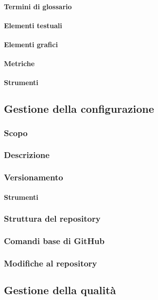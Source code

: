 \paragraph{Termini di glossario}
\paragraph{Elementi testuali}
\paragraph{Elementi grafici}
\paragraph{Metriche}
\paragraph{Strumenti}

\subsection{Gestione della configurazione}
\subsubsection{Scopo}
\subsubsection{Descrizione}
\subsubsection{Versionamento}
\paragraph{Strumenti}
\subsubsection{Struttura del repository}
\subsubsection{Comandi base di GitHub}
\subsubsection{Modifiche al repository}

\subsection{Gestione della qualità}
